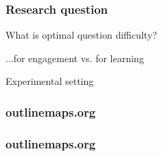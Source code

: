 \documentclass[bigger]{beamer}
\begin{document}
\begin{frame}
  \frametitle{Research question}
	\begin{center}
    {\Huge What is optimal question difficulty?} 

		\bigskip
    {\Huge ...for engagement vs. for learning}
	\end{center}
\end{frame}

\begin{frame}
	\begin{center}
    {\Huge Experimental setting} 
	\end{center}
\end{frame}

\begin{frame}
  \frametitle{outlinemaps.org}
	\noindent{}
\end{frame}

\begin{frame}
  \frametitle{outlinemaps.org}
	\noindent{}
\end{frame}
\end{document}
